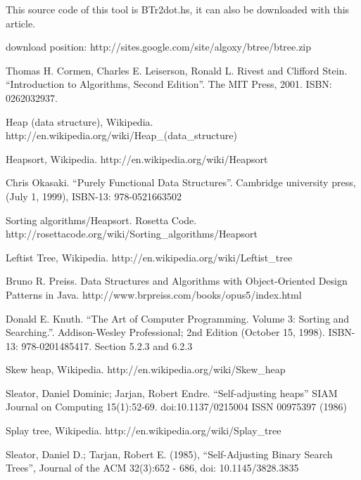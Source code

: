 \documentclass{article}
\begin{document}
This source code of this tool is BTr2dot.hs, it can also be downloaded 
with this article.

download position: http://sites.google.com/site/algoxy/btree/btree.zip

\begin{thebibliography}{99}

Thomas H. Cormen, Charles E. Leiserson, Ronald L. Rivest and Clifford Stein. ``Introduction to Algorithms, Second Edition''. The MIT Press, 2001. ISBN: 0262032937.

Heap (data structure), Wikipedia. http://en.wikipedia.org/wiki/Heap\_(data\_structure)

Heapsort, Wikipedia. http://en.wikipedia.org/wiki/Heapsort

Chris Okasaki. ``Purely Functional Data Structures''. Cambridge university press, (July 1, 1999), ISBN-13: 978-0521663502

Sorting algorithms/Heapsort. Rosetta Code. http://rosettacode.org/wiki/Sorting\_algorithms/Heapsort

Leftist Tree, Wikipedia. http://en.wikipedia.org/wiki/Leftist\_tree

Bruno R. Preiss. Data Structures and Algorithms with Object-Oriented Design Patterns in Java. http://www.brpreiss.com/books/opus5/index.html

Donald E. Knuth. ``The Art of Computer Programming. Volume 3: Sorting and Searching.''. Addison-Wesley Professional; 
2nd Edition (October 15, 1998). ISBN-13: 978-0201485417. Section 5.2.3 and 6.2.3

Skew heap, Wikipedia. http://en.wikipedia.org/wiki/Skew\_heap

Sleator, Daniel Dominic; Jarjan, Robert Endre. ``Self-adjusting heaps'' SIAM Journal on Computing 15(1):52-69. doi:10.1137/0215004 ISSN 00975397 (1986)

Splay tree, Wikipedia. http://en.wikipedia.org/wiki/Splay\_tree

Sleator, Daniel D.; Tarjan, Robert E. (1985), ``Self-Adjusting Binary Search Trees'', Journal of the ACM 32(3):652 - 686, doi: 10.1145/3828.3835

\end{thebibliography}

\ifx\wholebook\relax \else
\end{document}
